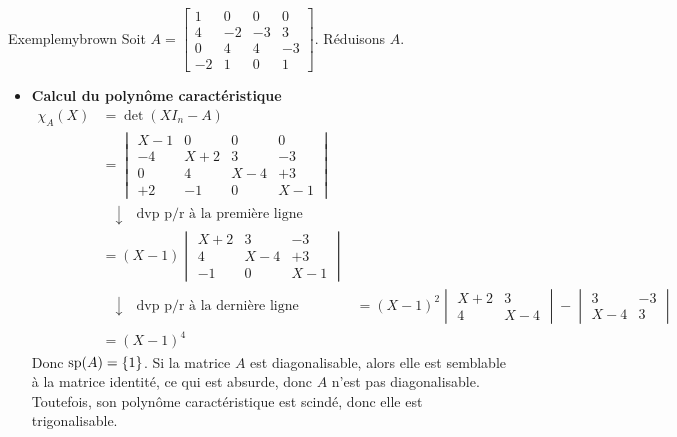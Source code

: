     \begin{omed}{Exemple}{mybrown}
        Soit $A = \begin{bmatrix}
            1 & 0 & 0 & 0 \\
            4 & -2 & -3 & 3 \\
            0 & 4 & 4 & -3 \\
            -2 & 1 & 0 & 1
        \end{bmatrix}$. Réduisons $A$.
        \begin{itemize}
            \item \textbf{Calcul du polynôme caractéristique} \quad 
            \begin{align*}
                \chi_A(X)
                &= \det(X I_n - A) \\
                &= \begin{vmatrix}
                    X - 1 & 0 & 0 & 0 \\
                    - 4 & X + 2 & 3 & -3 \\
                    0 & 4 & X - 4 & + 3 \\
                    +2 & -1 & 0 & X - 1
                \end{vmatrix} \\
                &\quad \downarrow \quad \text{dvp p/r à la première ligne} \\
                &= (X-1) \begin{vmatrix}
                    X + 2 & 3 & -3 \\
                    4 & X - 4 & + 3 \\
                    -1 & 0 & X - 1
                \end{vmatrix} \\
                &\quad \downarrow \quad \text{dvp p/r à la dernière ligne}
                &= (X-1)^2 \begin{vmatrix}
                    X + 2 & 3 \\
                    4 & X - 4
                \end{vmatrix} - \begin{vmatrix}
                    3 & - 3 \\
                    X - 4 & 3
                \end{vmatrix} \\
                &= (X - 1)^4
            \end{align*}
            Donc $\sp(A) = \left\{1\right\}$. Si la matrice $A$ est diagonalisable, alors elle est semblable à la matrice identité, ce qui est absurde, donc $A$ n’est pas diagonalisable. Toutefois, son polynôme caractéristique est scindé, donc elle est trigonalisable.

\end{itemize}
\end{omed}
